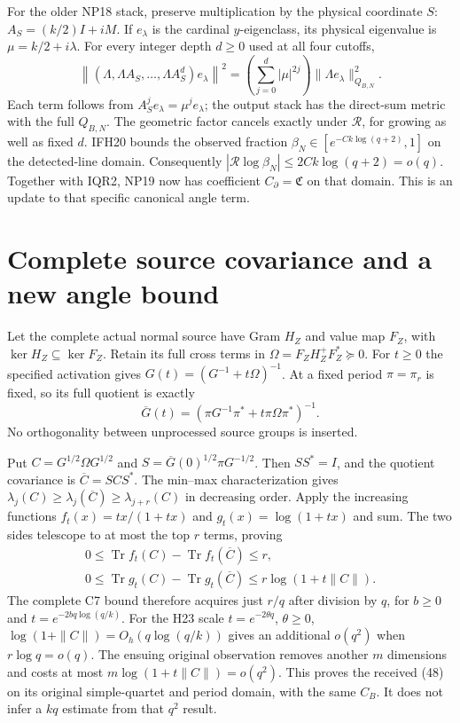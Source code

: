 \documentclass[11pt]{article}
\begin{document}
For the older NP18 stack, preserve multiplication by the physical
coordinate $S$: $A_S=(k/2)I+iM$. If $e_\lambda$ is the cardinal
$y$-eigenclass, its physical eigenvalue is $\mu=k/2+i\lambda$.
For every integer depth $d\ge0$ used at all four cutoffs,
\[
\left\|(\Lambda,\Lambda A_S,\ldots,\Lambda A_S^d)e_\lambda\right\|^2
=\left(\sum_{j=0}^d|\mu|^{2j}\right)
 \|\Lambda e_\lambda\|_{Q_{B,N}}^2 .
\tag{IQR12}
\]
Each term follows from $A_S^je_\lambda=\mu^je_\lambda$;
the output stack has the direct-sum metric with the full $Q_{B,N}$.
The geometric factor cancels exactly under $\mathcal R$, for growing
as well as fixed $d$. IFH20 bounds the observed fraction
$\beta_N\in[e^{-Ck\log(q+2)},1]$ on the detected-line domain.
Consequently $|\mathcal R\log\beta_N|\le2Ck\log(q+2)=o(q)$.
Together with IQR2, NP19 now has coefficient $C_\partial=\mathfrak C$
on that domain. This is an update to that specific canonical angle term.

\section{Complete source covariance and a new angle bound}
Let the complete actual normal source have Gram $H_Z$ and value
map $F_Z$, with $\ker H_Z\subseteq\ker F_Z$.
Retain its full cross terms in $\Omega=F_ZH_Z^+F_Z^*\succeq0$.
For $t\ge0$ the specified activation gives
$G(t)=(G^{-1}+t\Omega)^{-1}$. At a fixed period $\pi=\pi_r$ is fixed,
so its full quotient is exactly
\[
\overline G(t)=(\pi G^{-1}\pi^*+t\pi\Omega\pi^*)^{-1}.
\tag{IQR13}
\]
No orthogonality between unprocessed source groups is inserted.

Put $C=G^{1/2}\Omega G^{1/2}$ and
$S=\overline G(0)^{1/2}\pi G^{-1/2}$.
Then $SS^*=I$, and the quotient covariance is
$\overline C=SCS^*$.
The min--max characterization gives
$\lambda_j(C)\ge\lambda_j(\overline C)\ge\lambda_{j+r}(C)$
in decreasing order. Apply the increasing functions
$f_t(x)=tx/(1+tx)$ and $g_t(x)=\log(1+tx)$ and sum.
The two sides telescope to at most the top $r$ terms, proving
\[
\begin{gathered}
0\le\operatorname{Tr}f_t(C)-\operatorname{Tr}f_t(\overline C)\le r,\\
0\le\operatorname{Tr}g_t(C)-\operatorname{Tr}g_t(\overline C)
 \le r\log(1+t\|C\|).
\end{gathered}\tag{IQR14}
\]
The complete C7 bound \cite{Mixed} therefore acquires just $r/q$
after division by $q$, for $b\ge0$ and $t=e^{-2bq\log(q/k)}$.
For the H23 scale $t=e^{-2\theta q}$, $\theta\ge0$,
$\log(1+\|C\|)=O_h(q\log(q/k))$ gives an additional $o(q^2)$
when $r\log q=o(q)$. The ensuing original observation removes
another $m$ dimensions and costs at most
$m\log(1+t\|C\|)=o(q^2)$. This proves the received (48)
on its original simple-quartet and period domain, with the same $C_B$.
It does not infer a $kq$ estimate from that $q^2$ result.
\end{document}
